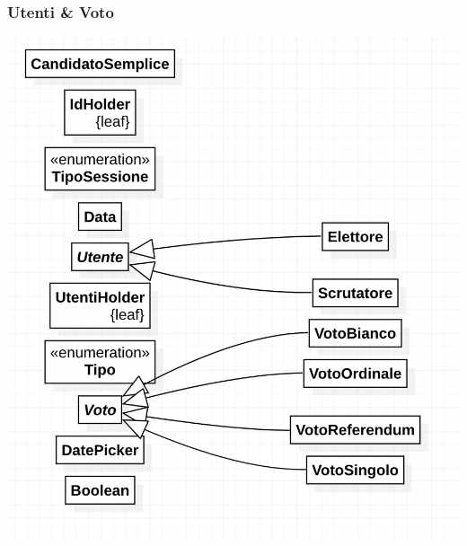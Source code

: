 \documentclass[11pt, oneside]{article}   	%
\begin{document}
\subsubsection{Utenti \& Voto}
\begin{center}
\includegraphics[scale=0.7]{images/class10.png}
\end{center}
\end{document}

